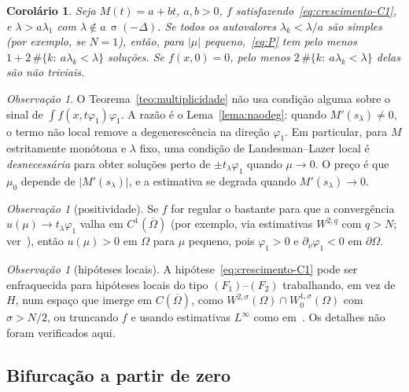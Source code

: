 \documentclass[11pt,a4paper]{article}
\theoremstyle{plain}
\newtheorem{corolario}[teorema]{Corolário}
\theoremstyle{definition}
\theoremstyle{remark}
\newtheorem{observacao}[teorema]{Observação}
\newcommand{\abs}[1]{\lvert #1\rvert}
\DeclareMathOperator{\spec}{\sigma}
\begin{document}
\begin{corolario}\label{cor:classico}
Seja $M(t)=a+bt$, $a,b>0$, $f$ satisfazendo~\eqref{eq:crescimento-C1}, e
$\lambda>a\lambda_1$ com $\lambda\notin a\,\spec(-\Delta)$. Se todos os
autovalores $\lambda_k<\lambda/a$ são simples (por exemplo, se $N=1$), então,
para $\abs{\mu}$ pequeno,~\eqref{eq:P} tem pelo menos
$1+2\,\#\{k:\ a\lambda_k<\lambda\}$ soluções. Se $f(x,0)=0$, pelo menos
$2\,\#\{k:\ a\lambda_k<\lambda\}$ delas são não triviais.
\end{corolario}

\begin{observacao}
O Teorema~\ref{teo:multiplicidade} não usa condição alguma sobre o sinal de
$\int f(x,t\varphi_1)\varphi_1$. A razão é o Lema~\ref{lema:naodeg}: quando
$M'(s_\lambda)\ne0$, o termo não local remove a degenerescência na direção
$\varphi_1$. Em particular, para $M$ estritamente monótona e $\lambda$ fixo,
uma condição de Landesman--Lazer local é \emph{desnecessária} para obter
soluções perto de $\pm t_\lambda\varphi_1$ quando $\mu\to0$. O preço é que
$\mu_0$ depende de $\abs{M'(s_\lambda)}$, e a estimativa se degrada quando
$M'(s_\lambda)\to0$.
\end{observacao}

\begin{observacao}[positividade]
Se $f$ for regular o bastante para que a convergência $u(\mu)\to t_\lambda\varphi_1$
valha em $C^1(\overline\Omega)$ (por exemplo, via estimativas $W^{2,q}$ com
$q>N$; ver~\cite{GilbargTrudinger2001}), então $u(\mu)>0$ em $\Omega$ para
$\mu$ pequeno, pois $\varphi_1>0$ e $\partial_\nu\varphi_1<0$ em $\partial\Omega$.
\end{observacao}

\begin{observacao}[hipóteses locais]
A hipótese~\eqref{eq:crescimento-C1} pode ser enfraquecida para hipóteses
locais do tipo $(F_1)$--$(F_2)$ trabalhando, em vez de $H$, num espaço que
imerge em $C(\overline\Omega)$, como $W^{2,\sigma}(\Omega)\cap W^{1,\sigma}_0(\Omega)$
com $\sigma>N/2$, ou truncando $f$ e usando estimativas $L^\infty$ como
em~\cite{RezendeSanchezSilva2019}. Os detalhes não foram verificados aqui.
\end{observacao}

\subsection{Bifurcação a partir de zero}\label{subsec:bif-zero}
\end{document}
